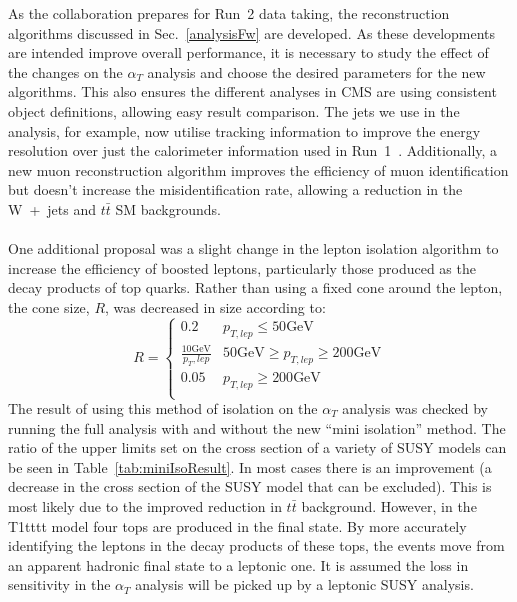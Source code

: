 \noindent As the collaboration prepares for Run~2 data taking, the reconstruction algorithms discussed in Sec.~\ref{analysisFw} are developed. As these developments are intended improve overall performance, it is necessary to study the effect of the changes on the $\alpha_T$ analysis and choose the desired parameters for the new algorithms. This also ensures the different analyses in CMS are using consistent object definitions, allowing easy result comparison. The jets we use in the analysis, for example, now utilise tracking information to improve the energy resolution over just the calorimeter information used in Run~1~\cite{CMSPFlow1}. Additionally, a new muon reconstruction algorithm improves the efficiency of muon identification but doesn't increase the misidentification rate, allowing a reduction in the W~+~jets and $t\bar{t}$ SM backgrounds. 
\\\\
One additional proposal was a slight change in the lepton isolation algorithm to increase the efficiency of boosted leptons, particularly those produced as the decay products of top quarks. Rather than using a fixed cone around the lepton, the cone size, $R$, was decreased in size according to:
\begin{equation}
R =
  \begin{cases}
    0.2       & p_{T,lep} \leq 50\textrm{GeV}\\
    \frac{10\textrm{GeV}}{p_T,lep}       & 50\textrm{GeV}\geq p_{T,lep} \geq 200\textrm{GeV}\\
    0.05     &  p_{T,lep} \geq 200\textrm{GeV}\\
  \end{cases}
\end{equation}
The result of using this method of isolation on the $\alpha_T$ analysis was checked by running the full analysis with and without the new ``mini isolation'' method. The ratio of the upper limits set on the cross section of a variety of SUSY models can be seen in Table~\ref{tab:miniIsoResult}. In most cases there is an improvement (a decrease in the cross section of the SUSY model that can be excluded). This is most likely due to the improved reduction in $t\bar{t}$ background. However, in the T1tttt model four tops are produced in the final state. By more accurately identifying the leptons in the decay products of these tops, the events move from an apparent hadronic final state to a leptonic one. It is assumed the loss in sensitivity in the $\alpha_T$ analysis will be picked up by a leptonic SUSY analysis.
